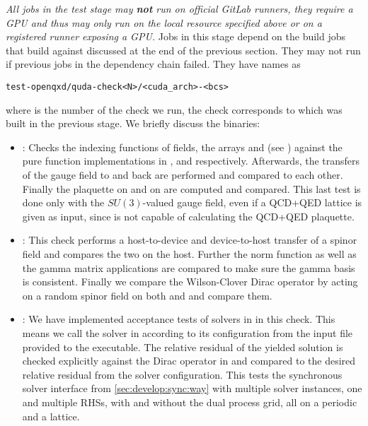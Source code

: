 \emph{All jobs in the test stage may \textbf{not} run on official GitLab runners, they require a GPU and thus may only run on the local resource specified above or on a registered runner exposing a GPU.}
Jobs in this stage depend on the build jobs that build \openqxd against \quda discussed at the end of the previous section.
They may not run if previous jobs in the dependency chain failed.
They have names as
\begin{verbatim}
test-openqxd/quda-check<N>/<cuda_arch>-<bcs>
\end{verbatim}
where  is the number of the check we run, \ie the check corresponds to  which was built in the previous stage.
We briefly discuss the binaries:
\begin{itemize}
  \item {}: Checks the indexing functions of fields, \ie the arrays  and  (see ) against the pure function implementations in \quda,  and  respectively. Afterwards, the transfers of the gauge field to \quda and back are performed and compared to each other. Finally the plaquette on \quda and on \openqxd are computed and compared. This last test is done only with the $SU(3)$-valued gauge field, even if a QCD+QED lattice is given as input, since \quda is not capable of calculating the QCD+QED plaquette.
  \item {}: This check performs a host-to-device and device-to-host transfer of a spinor field and compares the two on the host. Further the norm function as well as the gamma matrix applications are compared to make sure the gamma basis is consistent. Finally we compare the Wilson-Clover Dirac operator by acting on a random spinor field on both \openqxd and \quda and compare them.
  \item {}: We have implemented acceptance tests of solvers in \quda in this check. This means we call the solver in \quda according to its configuration from the input file provided to the executable. The relative residual of the yielded solution is checked explicitly against the Dirac operator in \openqxd and compared to the desired relative residual from the solver configuration. This tests the synchronous solver interface from \cref{sec:develop:sync:way} with multiple solver instances, one and multiple RHSs, with and without the dual process grid, all on a periodic and a \Cstar lattice.

\end{itemize}
